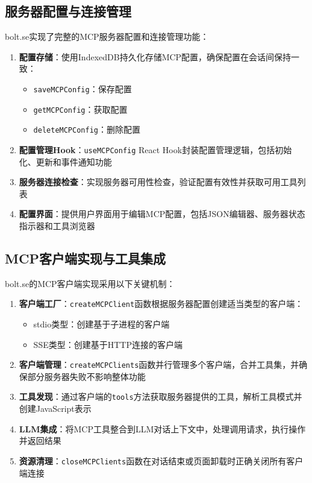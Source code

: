\subsection{服务器配置与连接管理}
bolt.se实现了完整的MCP服务器配置和连接管理功能：

\begin{enumerate}
  \item \textbf{配置存储}：使用IndexedDB持久化存储MCP配置，确保配置在会话间保持一致：
    \begin{itemize}
      \item \texttt{saveMCPConfig}：保存配置
      \item \texttt{getMCPConfig}：获取配置
      \item \texttt{deleteMCPConfig}：删除配置
    \end{itemize}
  
  \item \textbf{配置管理Hook}：\texttt{useMCPConfig} React Hook封装配置管理逻辑，包括初始化、更新和事件通知功能
  
  \item \textbf{服务器连接检查}：实现服务器可用性检查，验证配置有效性并获取可用工具列表
  
  \item \textbf{配置界面}：提供用户界面用于编辑MCP配置，包括JSON编辑器、服务器状态指示器和工具浏览器
\end{enumerate}

\subsection{MCP客户端实现与工具集成}
bolt.se的MCP客户端实现采用以下关键机制：

\begin{enumerate}
  \item \textbf{客户端工厂}：\texttt{createMCPClient}函数根据服务器配置创建适当类型的客户端：
    \begin{itemize}
      \item stdio类型：创建基于子进程的客户端
      \item SSE类型：创建基于HTTP连接的客户端
    \end{itemize}
  
  \item \textbf{客户端管理}：\texttt{createMCPClients}函数并行管理多个客户端，合并工具集，并确保部分服务器失败不影响整体功能
  
  \item \textbf{工具发现}：通过客户端的\texttt{tools}方法获取服务器提供的工具，解析工具模式并创建JavaScript表示
  
  \item \textbf{LLM集成}：将MCP工具整合到LLM对话上下文中，处理调用请求，执行操作并返回结果
  
  \item \textbf{资源清理}：\texttt{closeMCPClients}函数在对话结束或页面卸载时正确关闭所有客户端连接
\end{enumerate}


